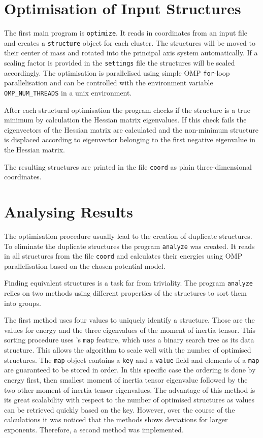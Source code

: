\section{Optimisation of Input Structures}
\label{sec:optimisationofinputstructures}

The first main program is \verb|optimize|. It reads in coordinates from an
input file and creates a \verb|structure| object for each cluster. The
structures will be moved to their center of mass and rotated into the principal
axis system automatically. If a scaling factor is provided in the
\verb|settings| file the structures will be scaled accordingly.  The
optimisation is parallelised using simple \ac{OMP} \verb|for|-loop
parallelisation and can be controlled with the environment variable
\verb|OMP_NUM_THREADS| in a unix environment.

After each structural optimisation the program checks if the structure is a
true minimum by calculation the Hessian matrix eigenvalues. If this check fails
the eigenvectors of the Hessian matrix are calculated and the non-minimum
structure is displaced according to eigenvector belonging to the first negative
eigenvalue in the Hessian matrix.

The resulting structures are printed in the file \verb|coord| as plain
three-dimensional coordinates.

\section{Analysing Results}
\label{sec:analysingresults}

The optimisation procedure usually lead to the creation of duplicate
structures. To eliminate the duplicate structures the program \verb|analyze|
was created. It reads in all structures from the file \verb|coord| and
calculates their energies using \ac{OMP} parallelisation based on the chosen
potential model.

Finding equivalent structures is a task far from triviality. The program
\verb|analyze| relies on two methods using different properties of the
structures to sort them into groups.

The first method uses four values to uniquely identify a structure. Those are
the values for energy and the three eigenvalues of the moment of inertia
tensor. This sorting procedure uses \Cpp's \verb|map| feature, which uses a
binary search tree as its data structure. This allows the algorithm to scale
well with the number of optimised structures. The \Cpp \verb|map| object
contains a \verb|key| and a \verb|value| field and elements of a \verb|map| are
guaranteed to be stored in order.\autocite{Stroustrup_programminglanguage_2000}
In this specific case the ordering is done by energy first, then smallest
moment of inertia tensor eigenvalue followed by the two other moment of inertia
tensor eigenvalues. The advantage of this method is its great scalability with
respect to the number of optimised structures as values can be retrieved
quickly based on the key.  However, over the course of the calculations it was
noticed that the methods shows deviations for larger exponents. Therefore, a
second method was implemented.

